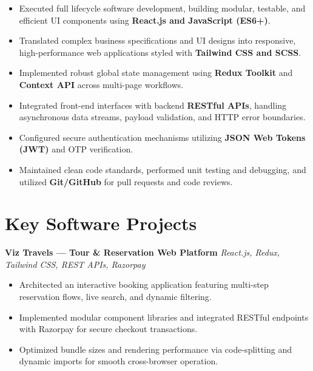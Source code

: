 \documentclass[a4paper,10pt]{article}
\begin{document}
\begin{itemize}

    \item Executed full lifecycle software development, building modular, testable, and efficient UI components using \textbf{React.js and JavaScript (ES6+)}.

    \item Translated complex business specifications and UI designs into responsive, high-performance web applications styled with \textbf{Tailwind CSS and SCSS}.

    \item Implemented robust global state management using \textbf{Redux Toolkit} and \textbf{Context API} across multi-page workflows.

    \item Integrated front-end interfaces with backend \textbf{RESTful APIs}, handling asynchronous data streams, payload validation, and HTTP error boundaries.

    \item Configured secure authentication mechanisms utilizing \textbf{JSON Web Tokens (JWT)} and OTP verification.

    \item Maintained clean code standards, performed unit testing and debugging, and utilized \textbf{Git/GitHub} for pull requests and code reviews.

\end{itemize}

\section*{Key Software Projects}

\textbf{Viz Travels --- Tour \& Reservation Web Platform}
\hfill
\textit{React.js, Redux, Tailwind CSS, REST APIs, Razorpay}

\begin{itemize}

    \item Architected an interactive booking application featuring multi-step reservation flows, live search, and dynamic filtering.

    \item Implemented modular component libraries and integrated RESTful endpoints with Razorpay for secure checkout transactions.

    \item Optimized bundle sizes and rendering performance via code-splitting and dynamic imports for smooth cross-browser operation.

\end{itemize}
\end{document}

